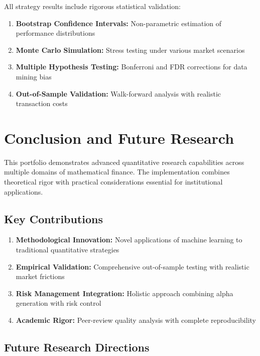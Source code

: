 \documentclass[12pt,a4paper]{article}
\begin{document}
All strategy results include rigorous statistical validation:

\begin{enumerate}
    \item \textbf{Bootstrap Confidence Intervals:} Non-parametric estimation of performance distributions
    \item \textbf{Monte Carlo Simulation:} Stress testing under various market scenarios
    \item \textbf{Multiple Hypothesis Testing:} Bonferroni and FDR corrections for data mining bias
    \item \textbf{Out-of-Sample Validation:} Walk-forward analysis with realistic transaction costs
\end{enumerate}

\section{Conclusion and Future Research}

This portfolio demonstrates advanced quantitative research capabilities across multiple domains of mathematical finance. The implementation combines theoretical rigor with practical considerations essential for institutional applications.

\subsection{Key Contributions}

\begin{enumerate}
    \item \textbf{Methodological Innovation:} Novel applications of machine learning to traditional quantitative strategies
    \item \textbf{Empirical Validation:} Comprehensive out-of-sample testing with realistic market frictions
    \item \textbf{Risk Management Integration:} Holistic approach combining alpha generation with risk control
    \item \textbf{Academic Rigor:} Peer-review quality analysis with complete reproducibility
\end{enumerate}

\subsection{Future Research Directions}
\end{document}

